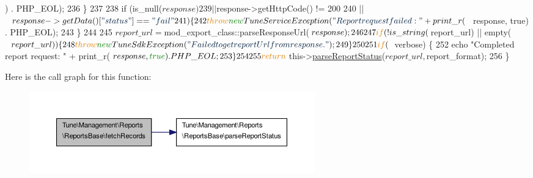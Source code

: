 \begin{DoxyCode}
      ) . PHP\_EOL);
236         \}
237 
238         \textcolor{keywordflow}{if} (is\_null($response)
239             || $response->getHttpCode() != 200
240             || $response->getData()[\textcolor{stringliteral}{"status"}] == \textcolor{stringliteral}{"fail"}
241         ) \{
242             \textcolor{keywordflow}{throw} \textcolor{keyword}{new} TuneServiceException(\textcolor{stringliteral}{"Report request failed: "} + print\_r($response, \textcolor{keyword}{true}) . PHP\_EOL);
243         \}
244 
245         $report\_url = $mod\_export\_class::parseResponseUrl($response);
246 
247         \textcolor{keywordflow}{if} (!is\_string($report\_url) || empty($report\_url)) \{
248             \textcolor{keywordflow}{throw} \textcolor{keyword}{new} TuneSdkException(\textcolor{stringliteral}{"Failed to get report Url from response."});
249         \}
250 
251         \textcolor{keywordflow}{if} ($verbose) \{
252             echo \textcolor{stringliteral}{"Completed report request: "} + print\_r($response, \textcolor{keyword}{true}) . PHP\_EOL;
253         \}
254 
255         \textcolor{keywordflow}{return} $this->\hyperlink{classTune_1_1Management_1_1Reports_1_1ReportsBase_a5cebfc222eef4019fcf3a428de5adcfe}{parseReportStatus}($report\_url, $report\_format);
256     \}
\end{DoxyCode}


Here is the call graph for this function\-:
\nopagebreak
\begin{figure}[H]
\begin{center}
\leavevmode
\includegraphics[width=350pt]{classTune_1_1Management_1_1Reports_1_1ReportsBase_ac6c3a238e99b0dfb88a83fc70924493b_cgraph}
\end{center}
\end{figure}


